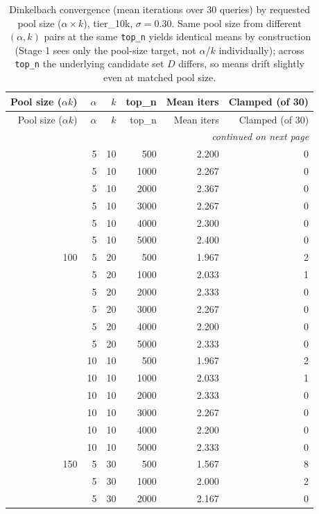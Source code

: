 \usepackage{longtable,booktabs}

\begin{longtable}{rrrrrr}
\caption{Dinkelbach convergence (mean iterations over 30 queries) by requested pool size ($\alpha \times k$), tier\_10k, $\sigma=0.30$. Same pool size from different $(\alpha,k)$ pairs at the same \texttt{top\_n} yields identical means by construction (Stage 1 sees only the pool-size target, not $\alpha$/$k$ individually); across \texttt{top\_n} the underlying candidate set $D$ differs, so means drift slightly even at matched pool size.}
\label{tab:dinkelbach-convergence-tier10k}\\
\toprule
Pool size ($\alpha k$) & $\alpha$ & $k$ & top\_n & Mean iters & Clamped (of 30) \\
\midrule
\endfirsthead
\toprule
Pool size ($\alpha k$) & $\alpha$ & $k$ & top\_n & Mean iters & Clamped (of 30) \\
\midrule
\endhead
\midrule \multicolumn{6}{r}{\textit{continued on next page}} \\ \midrule
\endfoot
\bottomrule
\endlastfoot
50 & 5 & 10 & 500 & 2.200 & 0 \\
 & 5 & 10 & 1000 & 2.267 & 0 \\
 & 5 & 10 & 2000 & 2.367 & 0 \\
 & 5 & 10 & 3000 & 2.267 & 0 \\
 & 5 & 10 & 4000 & 2.300 & 0 \\
 & 5 & 10 & 5000 & 2.400 & 0 \\
\midrule
100 & 5 & 20 & 500 & 1.967 & 2 \\
 & 5 & 20 & 1000 & 2.033 & 1 \\
 & 5 & 20 & 2000 & 2.333 & 0 \\
 & 5 & 20 & 3000 & 2.267 & 0 \\
 & 5 & 20 & 4000 & 2.200 & 0 \\
 & 5 & 20 & 5000 & 2.333 & 0 \\
 & 10 & 10 & 500 & 1.967 & 2 \\
 & 10 & 10 & 1000 & 2.033 & 1 \\
 & 10 & 10 & 2000 & 2.333 & 0 \\
 & 10 & 10 & 3000 & 2.267 & 0 \\
 & 10 & 10 & 4000 & 2.200 & 0 \\
 & 10 & 10 & 5000 & 2.333 & 0 \\
\midrule
150 & 5 & 30 & 500 & 1.567 & 8 \\
 & 5 & 30 & 1000 & 2.000 & 2 \\
 & 5 & 30 & 2000 & 2.167 & 0 \\

\end{longtable}
